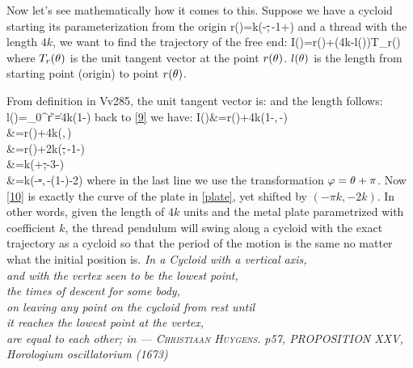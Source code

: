 \begin{center}
\end{center}

Now let's see mathematically how it comes to this.
Suppose we have a cycloid starting its parameterization from the origin
\eq
{
r(\ta)=k(\ta-\st,\,-1+\ct)
}
and a thread with the length $4k$, we want to find the trajectory of the free end:
\eq
{
I(\ta)=r(\ta)+(4k-l(\ta))T_r(\ta)
}
where $T_r(\theta)$ is the unit tangent vector at the point $r(\theta)$. $l(\theta)$ is 
the length from starting point (origin) to point $r(\theta)$.

From definition in Vv285, the unit tangent vector is:
and the length follows:
\eq
{
l(\ta)=\int_0^{\ta}\|r'\|=4k\left(1-\cos{}\right)
}
back to \eqref{9} we have:
\eq
{
I(\ta)&=r(\ta)+4k\cos{}\left(1-\ct,\,-\st\right)\\
&\quad=r(\ta)+4k\left(,\,\right)\\
&\quad=r(\ta)+2k\left(\st,\,-1-\ct\right)\\
&\quad=k(\ta+\st,-3-\ct)\\
&\quad=k(\p-\st-\pi,\,-(1-\ct)-2)
}
where in the last line we use the transformation $\varphi=\theta+\pi$. Now \eqref{10}
is exactly the curve of the plate in \eqref{plate}, yet shifted by $(-\pi k,-2k)$. In other words, given the length of $4k$ units and the metal plate parametrized with
coefficient $k$, the thread pendulum will swing along a cycloid with
the exact trajectory as a cycloid so that the period of the motion is the same no matter
what the initial position is.
\vskip 1in
{\flushright
	{\sffamily\slshape
	In a Cycloid with a vertical axis, \\
		and with the vertex seen to be the lowest point,\\
		 the times of descent for some body, \\
		 on leaving any point on the cycloid from rest until\\
		  it reaches the lowest point at the vertex,\\
		  are equal to each other;
		  in
		{\hfill\sffamily\upshape --- 
\textsc{Christiaan Huygens}. p57, PROPOSITION XXV,  \it Horologium oscillatorium \rm (1673)}
	}	
}
\vskip 2in
